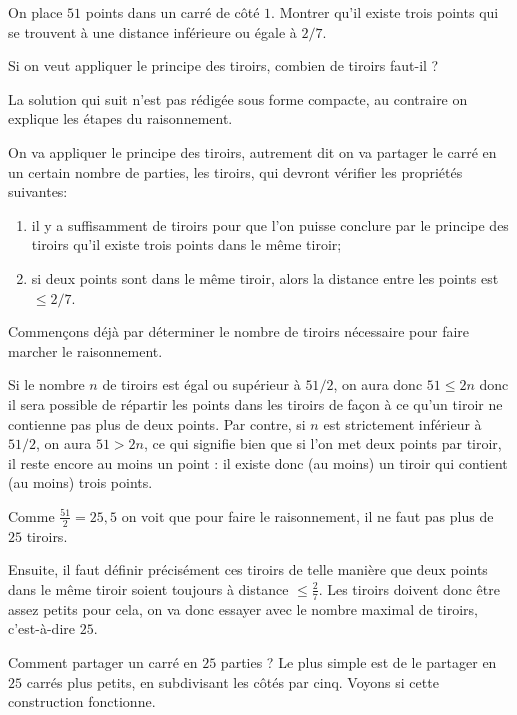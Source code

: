 \begin{exo}
On place $51$ points dans un carré de côté $1$. Montrer qu'il existe trois points qui se trouvent à une distance inférieure ou égale à $2/7$.

\begin{hint}
Si on veut appliquer le principe des tiroirs, combien de tiroirs faut-il ?
\end{hint}
\begin{sol} La solution qui suit n'est pas rédigée sous forme compacte, au contraire on explique les étapes du raisonnement.

On va appliquer le principe des tiroirs, autrement dit on va partager le carré en un certain nombre de parties, les tiroirs, qui devront vérifier les propriétés suivantes:
\begin{enumerate}
\item il y a suffisamment  de tiroirs pour que l'on puisse conclure par le principe des tiroirs qu'il existe trois points dans le même tiroir;
\item si deux points sont dans le même tiroir, alors la distance entre les points est $\leq 2/7$. 
\end{enumerate}

Commençons déjà par déterminer le nombre de tiroirs nécessaire pour faire marcher le raisonnement.

Si le nombre $n$ de tiroirs est égal ou supérieur à $51/2$, on aura donc $51 \leq 2n$ donc il sera possible de répartir les points dans les tiroirs de façon à ce qu'un tiroir ne contienne pas plus de deux points. Par contre, si $n$ est strictement inférieur à $51/2$, on aura $51> 2n$, ce qui signifie bien que si l'on met deux points par tiroir, il reste encore au moins un point : il existe donc (au moins) un tiroir qui contient (au moins) trois points.

Comme $\frac{51}{2} = 25,5$ on voit que pour faire le raisonnement, il ne faut pas plus de $25$ tiroirs. 

Ensuite, il faut définir précisément ces tiroirs de telle manière que deux points dans le même tiroir soient toujours à distance $\leq \frac{2}{7}$. Les tiroirs doivent donc être assez petits pour cela, on va donc essayer avec le nombre maximal de tiroirs, c'est-à-dire $25$.

Comment partager un carré en $25$ parties ? Le plus simple est de le partager en $25$ carrés plus petits, en subdivisant les côtés par cinq. Voyons si cette construction fonctionne.


\end{sol}
\end{exo}
